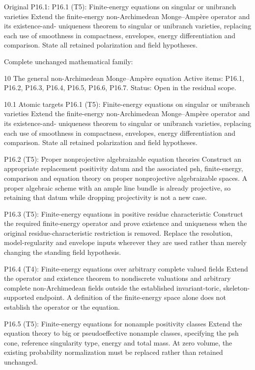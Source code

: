 \documentclass[
  10pt,
]{article}
\begin{document}
Original P16.1: P16.1 (T5): Finite-energy equations on singular or
unibranch varieties Extend the ﬁnite-energy non-Archimedean
Monge--Ampère operator and its existence-and- uniqueness theorem to
singular or unibranch varieties, replacing each use of smoothness in
compactness, envelopes, energy diﬀerentiation and comparison. State all
retained polarization and ﬁeld hypotheses.

Complete unchanged mathematical family:

10 The general non-Archimedean Monge--Ampère equation Active items:
P16.1, P16.2, P16.3, P16.4, P16.5, P16.6, P16.7. Status: Open in the
residual scope.

10.1 Atomic targets P16.1 (T5): Finite-energy equations on singular or
unibranch varieties Extend the ﬁnite-energy non-Archimedean
Monge--Ampère operator and its existence-and- uniqueness theorem to
singular or unibranch varieties, replacing each use of smoothness in
compactness, envelopes, energy diﬀerentiation and comparison. State all
retained polarization and ﬁeld hypotheses.

P16.2 (T5): Proper nonprojective algebraizable equation theories
Construct an appropriate replacement positivity datum and the associated
psh, ﬁnite-energy, comparison and equation theory on proper
nonprojective algebraizable spaces. A proper algebraic scheme with an
ample line bundle is already projective, so retaining that datum while
dropping projectivity is not a new case.

P16.3 (T5): Finite-energy equations in positive residue characteristic
Construct the required ﬁnite-energy operator and prove existence and
uniqueness when the original residue-characteristic restriction is
removed. Replace the resolution, model-regularity and envelope inputs
wherever they are used rather than merely changing the standing ﬁeld
hypothesis.

P16.4 (T4): Finite-energy equations over arbitrary complete valued ﬁelds
Extend the operator and existence theorem to nondiscrete valuations and
arbitrary complete non-Archimedean ﬁelds outside the established
invariant-toric, skeleton-supported endpoint. A deﬁnition of the
ﬁnite-energy space alone does not establish the operator or the
equation.

P16.5 (T5): Finite-energy equations for nonample positivity classes
Extend the equation theory to big or pseudoeﬀective nonample classes,
specifying the psh cone, reference singularity type, energy and total
mass. At zero volume, the existing probability normalization must be
replaced rather than retained unchanged.
\end{document}
